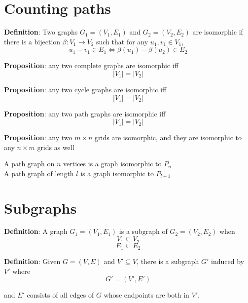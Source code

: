 \section{Counting paths}


\begin{framed}
   \textbf{Definition}: Two graphs $G_1 = (V_1, E_1)$  and $G_2 = (V_2, E_2)$ are isomorphic if there is a bijection $\beta :V_1 \rightarrow V_2$ such that for any $u_1, v_1 \in V_1$, 
   \[
     u_1 -v_1 \in E_1 \iff \beta(u_1) - \beta(u_2) \in E_2
   \] 
\end{framed}

\begin{framed}
   \textbf{Proposition}: any two complete graphs are isomorphic iff
   \[
     |V_1| = |V_2| 
   \]

   \textbf{Proposition}: any two cycle graphs are isomorphic iff
   \[
     |V_1| = |V_2|
   \] 

   \textbf{Proposition}: any two path graphs are isomorphic iff
   \[
     |V_1| = |V_2|
   \] 

   \textbf{Proposition}: any two $m \times n$ grids are isomorphic, and they are isomorphic to any $n \times m$ grids as well
\end{framed}

\begin{framed}
   A path graph on $n$ vertices is a graph isomorphic to $P_n$ \\

   A path graph of length  $l$ is a graph isomorphic to $P_{l + 1}$
\end{framed}

\section{Subgraphs}
\begin{framed}
  \textbf{Definition}:  A graph $G_1 = (V_1, E_1)$ is a subgraph of $G_2 = (V_2, E_2)$ when
   \[
     V_1 \subseteq V_2 \] 
     \[
       E_1 \subseteq E_2
     \] 
\end{framed}

\begin{framed}
   \textbf{Definition}: Given $G = (V, E)$ and $V' \subseteq V$, there is a subgraph  $G'$ induced  by $V'$ where
       \[
        G' = (V', E')
      \] 

      and $E'$ consists of all edges of $G$ whose endpoints are both in $V'$. 
\end{framed}

